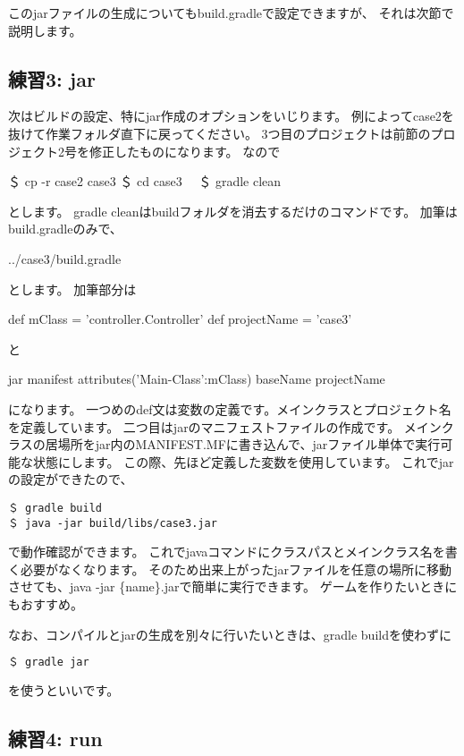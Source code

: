 \documentclass[a4paper,12pt]{article}
\begin{document}
このjarファイルの生成についてもbuild.gradleで設定できますが、
それは次節で説明します。

\newpage
\subsection{練習3: jar}

次はビルドの設定、特にjar作成のオプションをいじります。
例によってcase2を抜けて作業フォルダ直下に戻ってください。
3つ目のプロジェクトは前節のプロジェクト2号を修正したものになります。
なので
\begin{shell}
＄ cp -r case2 case3
＄ cd case3　
＄ gradle clean
\end{shell}
とします。
gradle cleanはbuildフォルダを消去するだけのコマンドです。
加筆はbuild.gradleのみで、
\begin{lstinputlisting}[caption=case3/build.gradle]
	{../case3/build.gradle}
\end{lstinputlisting}
とします。
加筆部分は
\begin{java}
def mClass = 'controller.Controller'
def projectName = 'case3'
\end{java}
と
\newpage
\begin{java}
jar {
	manifest {
		attributes('Main-Class':mClass)
		baseName projectName
	}
}
\end{java}
になります。
一つめのdef文は変数の定義です。メインクラスとプロジェクト名を定義しています。
二つ目はjarのマニフェストファイルの作成です。
メインクラスの居場所をjar内のMANIFEST.MFに書き込んで、jarファイル単体で実行可能な状態にします。
この際、先ほど定義した変数を使用しています。
これでjarの設定ができたので、
\begin{lstlisting}
＄ gradle build
＄ java -jar build/libs/case3.jar
\end{lstlisting}
で動作確認ができます。
これでjavaコマンドにクラスパスとメインクラス名を書く必要がなくなります。
そのため出来上がったjarファイルを任意の場所に移動させても、java -jar \{name\}.jarで簡単に実行できます。
ゲームを作りたいときにもおすすめ。

なお、コンパイルとjarの生成を別々に行いたいときは、gradle buildを使わずに
\begin{lstlisting}[language=bash]
＄ gradle jar
\end{lstlisting}
を使うといいです。

\subsection{練習4: run}
\end{document}
